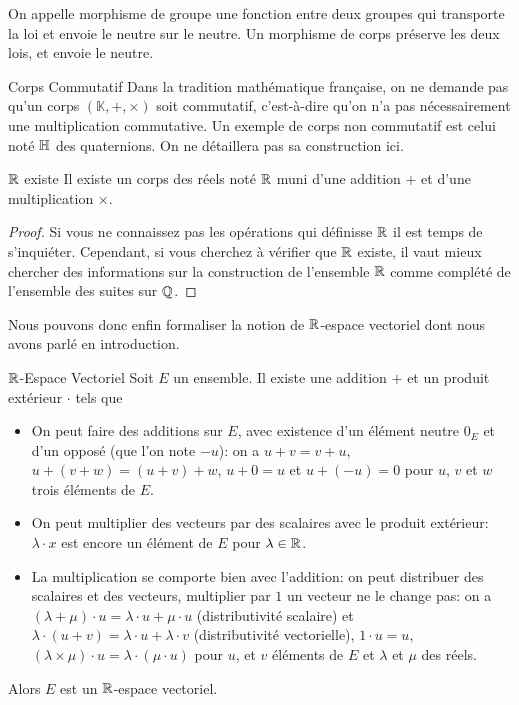\documentclass{classe}
\renewcommand*{\K}{\mathbb{K}}
\begin{document}
On appelle morphisme de groupe une fonction entre deux groupes qui transporte la loi et envoie le neutre sur le neutre. Un morphisme de corps préserve les deux lois, et envoie le neutre.

\begin{remarque}{Corps Commutatif}{}
	Dans la tradition mathématique française, on ne demande pas qu'un corps $\left( \K, +, \times \right)$ soit commutatif, c'est-à-dire qu'on n'a pas nécessairement une multiplication commutative.
	Un exemple de corps non commutatif est celui noté $\mathbb{H}$ des quaternions. On ne détaillera pas sa construction ici.
\end{remarque}

\begin{théorème}{$\mathbb{R}$ existe}{}
	Il existe un corps des réels noté $\mathbb{R}$ muni d'une addition $+$ et d'une multiplication $\times$.
\end{théorème}
\begin{proof}
	Si vous ne connaissez pas les opérations qui définisse $\mathbb{R}$ il est temps de s'inquiéter. Cependant, si vous cherchez à vérifier que $\mathbb{R}$ existe, il vaut mieux chercher des informations sur la construction de l'ensemble $\mathbb{R}$ comme complété de l'ensemble des suites sur $\mathbb{Q}$.
\end{proof}

Nous pouvons donc enfin formaliser la notion de $\mathbb{R}$-espace vectoriel dont nous avons parlé en introduction.

\begin{définition}{$\mathbb{R}$-Espace Vectoriel}{}
	Soit $E$ un ensemble. Il existe une addition $+$ et un produit extérieur $\cdot$ tels que
	\begin{itemize}
		\item On peut faire des additions sur $E$, avec existence d'un élément neutre $0_E$ et d'un opposé (que l'on note $-u$): on a $u+v = v+u$, $u+(v+w) = (u+v)+w$, $u+0=u$ et $u + (-u) = 0$ pour $u$, $v$ et $w$ trois éléments de $E$.
		\item On peut multiplier des vecteurs par des scalaires avec le produit extérieur: $\lambda\cdot x$ est encore un élément de $E$ pour $\lambda \in \mathbb{R}$.
		\item La multiplication se comporte bien avec l'addition: on peut distribuer des scalaires et des vecteurs, multiplier par $1$ un vecteur ne le change pas: on a $(\lambda + \mu)\cdot u = \lambda\cdot u + \mu\cdot u$ (distributivité scalaire) et $\lambda\cdot (u+v) = \lambda \cdot u+\lambda\cdot v$ (distributivité vectorielle), $1\cdot u = u$, $(\lambda\times\mu)\cdot u = \lambda\cdot (\mu\cdot u)$ pour $u$, et $v$ éléments de $E$ et $\lambda$ et $\mu$ des réels.
	\end{itemize}
	Alors $E$ est un $\mathbb{R}$-espace vectoriel.
\end{définition}
\end{document}
